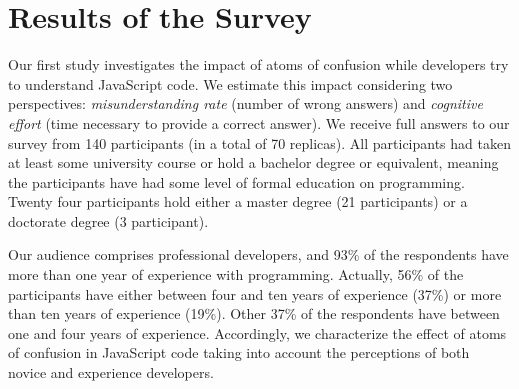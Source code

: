 

\section{Results of the Survey}
\label{sec:survey-resuts} 

Our first study investigates the impact of atoms of confusion while developers try to understand JavaScript code.
We estimate this impact considering two perspectives: \emph{misunderstanding rate} (number of wrong answers)
and \emph{cognitive effort} (time necessary to provide a correct answer). We receive full answers to our survey
from 140 participants (in a total of 70 replicas).
All participants had taken at least some university course or hold a bachelor
degree or equivalent, meaning the participants have had some
level of formal education on programming.
Twenty four participants hold either a master degree (21 participants) or a doctorate degree (3 participant). 



  

Our audience comprises professional developers,
and 93\% of the respondents have more than one year of experience with programming.
Actually, 56\% of the participants have either between four and ten years of experience (37\%)
or more than ten years of experience (19\%). Other 37\% of the respondents have between one and four years of experience.
Accordingly, we characterize the effect of atoms of confusion in JavaScript
code taking into account the perceptions of both novice and experience developers. 

